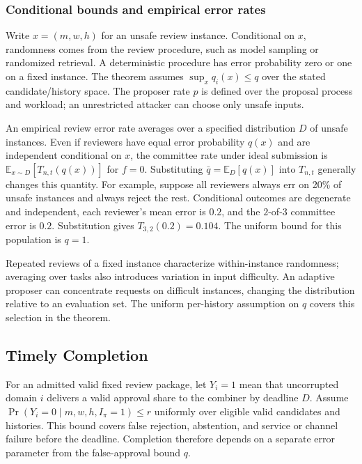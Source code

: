 \documentclass{article}
\begin{document}
\subsubsection{Conditional bounds and empirical error rates}
\label{app:measurement}
Write $x=(m,w,h)$ for an unsafe review instance. Conditional on $x$, randomness
comes from the review procedure, such as model sampling or randomized
retrieval. A deterministic procedure has error probability zero or one on a
fixed instance. The theorem assumes $\sup_x q_i(x)\le q$ over the stated
candidate/history space. The proposer rate $p$ is defined over the proposal
process and workload; an unrestricted attacker can choose only unsafe inputs.

An empirical review error rate averages over a specified distribution
$D$ of unsafe instances. Even if reviewers have equal error probability
$q(x)$ and are independent conditional on $x$, the committee rate under ideal
submission is $\mathbb E_{x\sim D}[T_{n,t}(q(x))]$ for $f=0$.
Substituting $\bar q=\mathbb E_D[q(x)]$ into $T_{n,t}$ generally changes this
quantity. For example, suppose all reviewers always err on 20\% of unsafe
instances and always reject the rest. Conditional outcomes are degenerate
and independent, each reviewer's mean error is $0.2$, and the $2$-of-$3$
committee error is $0.2$. Substitution gives $T_{3,2}(0.2)=0.104$.
The uniform bound for this population is $q=1$.

Repeated reviews of a fixed instance characterize within-instance randomness;
averaging over tasks also introduces variation in input difficulty. An
adaptive proposer can concentrate requests on difficult instances, changing
the distribution relative to an evaluation set. The uniform per-history
assumption on $q$ covers this selection in the theorem.

\subsection{Timely Completion}
\label{app:availability}

For an admitted valid fixed review package, let $Y_i=1$ mean that uncorrupted
domain $i$ delivers a valid approval share to the combiner by deadline $D$. Assume
$\Pr(Y_i=0\mid m,w,h,I_\pi=1)\le r$ uniformly over eligible valid candidates
and histories. This bound covers false rejection, abstention, and service or
channel failure before the deadline. Completion therefore depends on a
separate error parameter from the false-approval bound $q$.
\end{document}
